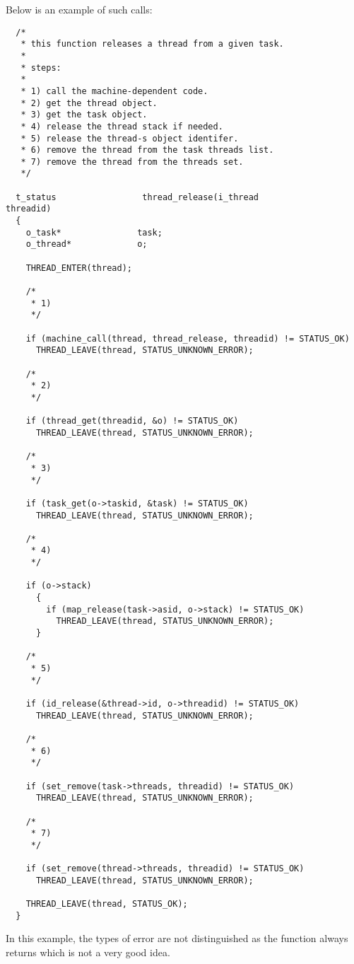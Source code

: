Below is an example of such calls:

\begin{verbatim}
  /*
   * this function releases a thread from a given task.
   *
   * steps:
   *
   * 1) call the machine-dependent code.
   * 2) get the thread object.
   * 3) get the task object.
   * 4) release the thread stack if needed.
   * 5) release the thread-s object identifer.
   * 6) remove the thread from the task threads list.
   * 7) remove the thread from the threads set.
   */

  t_status                 thread_release(i_thread                 threadid)
  {
    o_task*               task;
    o_thread*             o;

    THREAD_ENTER(thread);

    /*
     * 1)
     */

    if (machine_call(thread, thread_release, threadid) != STATUS_OK)
      THREAD_LEAVE(thread, STATUS_UNKNOWN_ERROR);

    /*
     * 2)
     */

    if (thread_get(threadid, &o) != STATUS_OK)
      THREAD_LEAVE(thread, STATUS_UNKNOWN_ERROR);

    /*
     * 3)
     */

    if (task_get(o->taskid, &task) != STATUS_OK)
      THREAD_LEAVE(thread, STATUS_UNKNOWN_ERROR);

    /*
     * 4)
     */

    if (o->stack)
      {
        if (map_release(task->asid, o->stack) != STATUS_OK)
          THREAD_LEAVE(thread, STATUS_UNKNOWN_ERROR);
      }

    /*
     * 5)
     */

    if (id_release(&thread->id, o->threadid) != STATUS_OK)
      THREAD_LEAVE(thread, STATUS_UNKNOWN_ERROR);

    /*
     * 6)
     */

    if (set_remove(task->threads, threadid) != STATUS_OK)
      THREAD_LEAVE(thread, STATUS_UNKNOWN_ERROR);

    /*
     * 7)
     */

    if (set_remove(thread->threads, threadid) != STATUS_OK)
      THREAD_LEAVE(thread, STATUS_UNKNOWN_ERROR);

    THREAD_LEAVE(thread, STATUS_OK);
  }
\end{verbatim}

In this example, the types of error are not distinguished as the function
always returns  which is not a very good idea.
